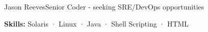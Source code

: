 \documentclass{article}
\begin{document}
\begin{cv}[avatar]{Jason Reeves}{Senior Coder - seeking SRE/DevOps opportunities}
\begin{cvevent}[Nov 1995][Jan 1997]
  \textbf{Skills:} Solaris · Linux · Java · Shell Scripting · HTML
  \vspace*{5mm}
\end{cvevent}

\end{cv}
\end{document}

